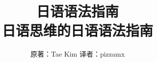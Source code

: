 \documentclass[UTF8, a4paper, 11pt, twoside]{ctexrep}
\title{%
    日语语法指南\\
    \Large 日语思维的日语语法指南}
\author{原著：Tae Kim 译者：pizzamx}
\begin{document}
\tkbegin


\end{document}
